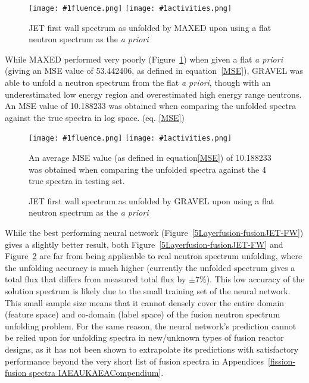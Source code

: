 \documentclass[a4paper, 12pt]{article}
\newcommand{\fluenceandactivities}[1]{
\texttt{[image: \#1fluence.png]}
\texttt{[image: \#1activities.png]}
}
\begin{document}
\begin{figure}[H]
\centering
    \fluenceandactivities{/home/ocean/Documents/GitHubDir/unfolding/unfolding/unfoldingsuite/neuralnetwork/realinputEarlyStopping/comparison/real_fusion_test_maxed_test_000_}
    \caption{JET first wall spectrum as unfolded by MAXED upon using a flat neutron spectrum as the \emph{a priori}}\label{maxed_flat_a_priori_JET}
\end{figure}
    
While MAXED performed very poorly (Figure~\ref{maxed_flat_a_priori_JET}) when given a flat \emph{a priori} (giving an MSE value of 53.442406, as defined in equation~\ref{MSE}), GRAVEL was able to unfold a neutron spectrum from the flat \emph{a priori}, though with an underestimated low energy region and overestimated high energy range neutrons.
An MSE value of 10.188233 was obtained when comparing the unfolded spectra against the true spectra in log space. (eq. \ref{MSE})

\begin{figure}
\centering
    \fluenceandactivities{/home/ocean/Documents/GitHubDir/unfolding/unfolding/unfoldingsuite/neuralnetwork/realinputEarlyStopping/comparison/real_fusion_test_gravel_test_001_}
    \caption{JET first wall spectrum as unfolded by GRAVEL upon using a flat neutron spectrum as the \emph{a priori}}\label{gravel_flat_a_priori_JET}
    An average MSE value (as defined in equation\ref{MSE}) of 10.188233 was obtained when comparing the unfolded spectra against the 4 true spectra in testing set.
\end{figure}

While the best performing neural network (Figure~\ref{5Layerfusion-fusionJET-FW}) gives a slightly better result, both Figure~\ref{5Layerfusion-fusionJET-FW} and Figure~\ref{gravel_flat_a_priori_JET} are far from being applicable to real neutron spectrum unfolding, where the unfolding accuracy is much higher (currently the unfolded spectrum gives a total flux that differs from measured total flux by $\pm 7\%$\cite{bethColling_TBMD}). This low accuracy of the solution spectrum is likely due to the small training set of the neural network. This small sample size means that it cannot densely cover the entire domain (feature space) and co-domain (label space) of the fusion neutron spectrum unfolding problem. For the same reason, the neural network's prediction cannot be relied upon for unfolding spectra in new/unknown types of fusion reactor designs, as it has not been shown to extrapolate its predictions with satisfactory performance beyond the very short list of fusion spectra in Appendices~\ref{fission-fusion spectra IAEAUKAEACompendium}.
\end{document}
